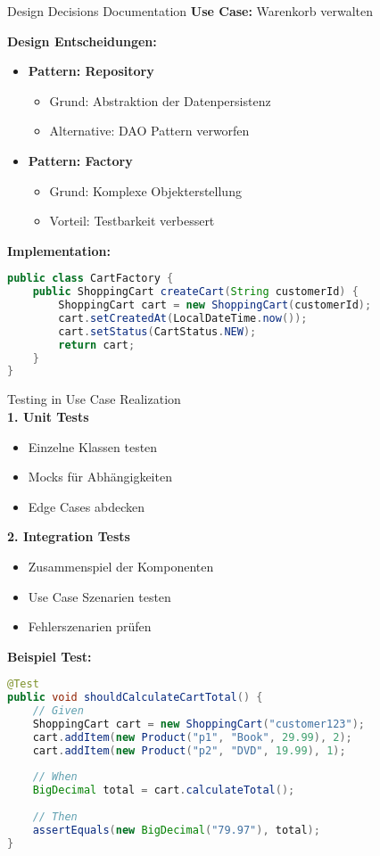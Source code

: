 \begin{example2}{Design Decisions Documentation}
\textbf{Use Case:} Warenkorb verwalten

\textbf{Design Entscheidungen:}
\begin{itemize}
    \item \textbf{Pattern: Repository}
    \begin{itemize}
        \item Grund: Abstraktion der Datenpersistenz
        \item Alternative: DAO Pattern verworfen
    \end{itemize}
    
    \item \textbf{Pattern: Factory}
    \begin{itemize}
        \item Grund: Komplexe Objekterstellung
        \item Vorteil: Testbarkeit verbessert
    \end{itemize}
\end{itemize}

\textbf{Implementation:}
\begin{lstlisting}[language=Java, style=basesmol]
public class CartFactory {
    public ShoppingCart createCart(String customerId) {
        ShoppingCart cart = new ShoppingCart(customerId);
        cart.setCreatedAt(LocalDateTime.now());
        cart.setStatus(CartStatus.NEW);
        return cart;
    }
}
\end{lstlisting}
\end{example2}

\begin{KR}{Testing in Use Case Realization}\\
\textbf{1. Unit Tests}
\begin{itemize}
    \item Einzelne Klassen testen
    \item Mocks für Abhängigkeiten
    \item Edge Cases abdecken
\end{itemize}

\textbf{2. Integration Tests}
\begin{itemize}
    \item Zusammenspiel der Komponenten
    \item Use Case Szenarien testen
    \item Fehlerszenarien prüfen
\end{itemize}

\textbf{Beispiel Test:}
\begin{lstlisting}[language=Java, style=basesmol]
@Test
public void shouldCalculateCartTotal() {
    // Given
    ShoppingCart cart = new ShoppingCart("customer123");
    cart.addItem(new Product("p1", "Book", 29.99), 2);
    cart.addItem(new Product("p2", "DVD", 19.99), 1);
    
    // When
    BigDecimal total = cart.calculateTotal();
    
    // Then
    assertEquals(new BigDecimal("79.97"), total);
}
\end{lstlisting}
\end{KR}

